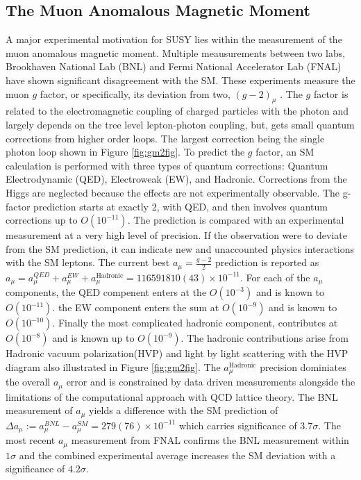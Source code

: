 \subsection{The Muon Anomalous Magnetic Moment}

A major experimental motivation for SUSY lies within the measurement of the muon anomalous magnetic moment.  Multiple meausurements between two labs, Brookhaven National Lab (BNL) and Fermi National Accelerator Lab (FNAL) have shown significant disagreement with the SM. These experiments measure the muon $g$ factor, or specifically, its deviation from two, $(g-2)_\mu$ .  The $g$ factor is related to the electromagnetic coupling of charged particles with the photon and largely depends on the tree level lepton-photon coupling, but, gets small quantum corrections from higher order loops. The largest correction being the single photon loop shown in Figure \ref{fig:gm2fig}. To predict the $g$ factor, an SM calculation is performed with three types of quantum corrections: Quantum Electrodynamic (QED), Electroweak (EW), and Hadronic. Corrections from the Higgs are neglected because the effects are not experimentally observable. %
The g-factor prediction starts at exactly 2, with QED, and then involves quantum corrections up to $O(10^{-11})$. The prediction is compared with an experimental measurement at a very high level of precision. If the observation were to deviate from the SM prediction, it can indicate new and unaccounted physics interactions with the SM leptons.
The current best $a_\mu = \frac{g-2}{2}$ prediction is reported as $a_\mu= a_\mu^{QED}+ a_\mu^{EW}+a_\mu^{\text{Hadronic}} =  116 591 810(43) \times 10^{-11}$.
 For each of the $a_\mu$ components, the QED compenent enters at the $O(10^{-3})$ and is known to $O(10^{-11})$. the EW component enters the sum at $O(10^{-9})$ and is known to $O(10^{-10})$. Finally the most complicated hadronic component, contributes at $O(10^{-8})$ and is known up to $O(10^{-9})$. The hadronic contributions arise from Hadronic vacuum polarization(HVP) and light by light scattering with the  HVP diagram also illustrated in Figure \ref{fig:gm2fig}. The $a_\mu^{\text{Hadronic}}$ precision dominiates the overall $a_\mu$ error and is constrained by data driven measurements alongside the limitations of the computational approach with QCD lattice theory. The BNL measurement of $a_\mu$ yields a difference with the SM prediction of $\Delta a_\mu := a_\mu^{BNL} - a_\mu^{SM} = 279(76) \times 10^{-11}$ which carries significance of $3.7\sigma$. The most recent $a_\mu$ measurement from FNAL confirms the BNL measurement within $1\sigma$ and the combined experimental average increases the SM deviation with a significance of $4.2\sigma$.


